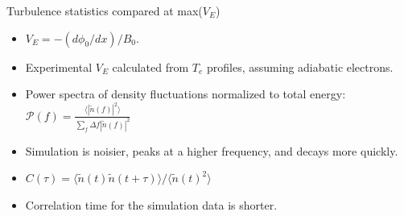 \documentclass[12pt,table]{beamer}
\begin{document}
\begin{frame}{Turbulence statistics compared at max($V_E$)}
\begin{minipage}{.5\linewidth}
\scriptsize
\begin{itemize}
    \vspace{-1cm}
    \item $V_E = -(d\phi_0/dx)/B_0$. 
    \item Experimental $V_E$ calculated from $T_e$ profiles, assuming adiabatic electrons.
    \vspace{1.5cm}
    \item Power spectra of density fluctuations normalized to total energy: \\
    $\mathcal{P}(f) = \frac{\langle |\tilde{n}(f)|^2 \rangle}{\sum_f \Delta f |\tilde{n}(f)|^2}$
    \item Simulation is noisier, peaks at a higher frequency, and decays more quickly.
    \vspace{1cm}
    \item $C(\tau) = \langle \tilde{n}(t) \tilde{n}(t+\tau) \rangle / \langle \tilde{n}(t)^2 \rangle$
    \item Correlation time for the simulation data is shorter.
\end{itemize}
\end{minipage}
\end{frame}
\end{document}

